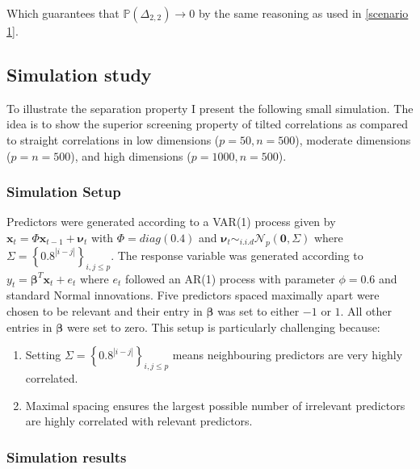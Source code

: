 \documentclass[11pt]{report}\usepackage[utf8]{inputenc}
\begin{document}
Which guarantees that $\mathbb{P}\left ( \Delta_{2,2} \right ) \rightarrow 0$ by the same reasoning as used in \ref{scenario 1}. 

\subsection{Simulation study}\label{separation sim explained}

To illustrate the separation property I present the following small simulation. The idea is to show the superior screening property of tilted correlations as compared to straight correlations in low dimensions ($p = 50, n = 500$), moderate dimensions ($p=n=500$), and high dimensions ($p = 1000, n = 500$).

\subsubsection{Simulation Setup}

Predictors were generated according to a VAR(1) process given by $\mathbf{x}_t = \Phi \mathbf{x}_{t-1} + \boldsymbol{\nu}_t$ with $\Phi = \textit{diag}\left ( 0.4 \right )$ and $\boldsymbol{\nu}_t \sim_{i.i.d} \mathcal{N}_p\left ( \mathbf{0}, \Sigma \right )$ where $\Sigma = \left \{ 0.8^{|i-j|} \right \}_{i,j \leq p}$. The response variable was generated according to $y_t = \boldsymbol{\beta}^T\mathbf{x}_t + e_t$ where $e_t$ followed an AR(1) process with parameter $\phi = 0.6$ and standard Normal innovations. Five predictors spaced maximally apart were chosen to be relevant and their entry in $\boldsymbol{\beta}$ was set to either $-1$ or $1$. All other entries in $\boldsymbol{\beta}$ were set to zero. This setup is particularly challenging because: 

\begin{enumerate}
    \item Setting $\Sigma = \left \{ 0.8^{|i-j|} \right \}_{i,j \leq p}$ means neighbouring predictors are very highly correlated.
    \item Maximal spacing ensures the largest possible number of irrelevant predictors are highly correlated with relevant predictors.
\end{enumerate}

\subsubsection{Simulation results}
\end{document}
